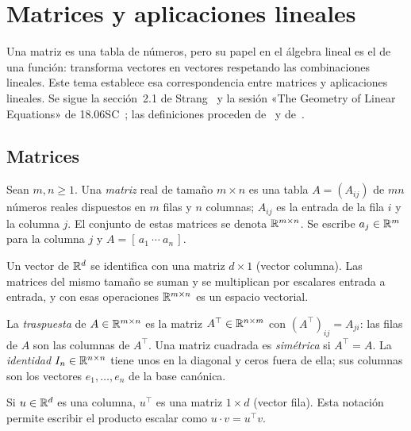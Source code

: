 \chapter{Matrices y aplicaciones lineales}
\label{tema:3}

Una matriz es una tabla de números, pero su papel en el álgebra lineal es el de una función: transforma vectores en vectores respetando las combinaciones lineales. Este tema establece esa correspondencia entre matrices y aplicaciones lineales. Se sigue la sección~2.1 de Strang~\cite{strang} y la sesión «The Geometry of Linear Equations» de 18.06SC~\cite{mit1806sc}; las definiciones proceden de~\cite[§2.2 y §2.7]{mml} y de~\cite[cap.~6 y §8.1]{vmls}.

\section{Matrices}

\begin{definicion}[Matriz]
Sean $m,n\ge 1$. Una \emph{matriz} real de tamaño $m\times n$ es una tabla $A=(A_{ij})$ de $mn$ números reales dispuestos en $m$ filas y $n$ columnas; $A_{ij}$ es la entrada de la fila $i$ y la columna $j$. El conjunto de estas matrices se denota $\mathbb{R}^{m\times n}$. Se escribe $a_j\in\mathbb{R}^{m}$ para la columna $j$ y $A=[\,a_1\ \cdots\ a_n\,]$.
\end{definicion}

Un vector de $\mathbb{R}^{d}$ se identifica con una matriz $d\times 1$ (vector columna). Las matrices del mismo tamaño se suman y se multiplican por escalares entrada a entrada, y con esas operaciones $\mathbb{R}^{m\times n}$ es un espacio vectorial.

\begin{definicion}
La \emph{traspuesta} de $A\in\mathbb{R}^{m\times n}$ es la matriz $A^{\top}\in\mathbb{R}^{n\times m}$ con $(A^{\top})_{ij}=A_{ji}$: las filas de $A$ son las columnas de $A^{\top}$. Una matriz cuadrada es \emph{simétrica} si $A^{\top}=A$. La \emph{identidad} $I_n\in\mathbb{R}^{n\times n}$ tiene unos en la diagonal y ceros fuera de ella; sus columnas son los vectores $e_1,\dots,e_n$ de la base canónica.
\end{definicion}

Si $u\in\mathbb{R}^{d}$ es una columna, $u^{\top}$ es una matriz $1\times d$ (vector fila). Esta notación permite escribir el producto escalar como $u\cdot v=u^{\top}v$.

